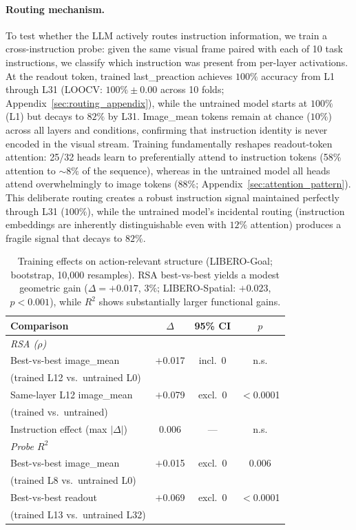 \paragraph{Routing mechanism.}
To test whether the LLM actively routes instruction information, we train a cross-instruction probe: given the same visual frame paired with each of 10 task instructions, we classify which instruction was present from per-layer activations.
At the readout token, trained last\_preaction achieves $100\%$ accuracy from L1 through L31 (LOOCV: $100\% \pm 0.00$ across 10 folds; Appendix~\ref{sec:routing_appendix}), while the untrained model starts at $100\%$ (L1) but decays to $82\%$ by L31.
Image\_mean tokens remain at chance ($10\%$) across all layers and conditions, confirming that instruction identity is never encoded in the visual stream.
Training fundamentally reshapes readout-token attention: 25/32 heads learn to preferentially attend to instruction tokens (58\% attention to ${\sim}8\%$ of the sequence), whereas in the untrained model all heads attend overwhelmingly to image tokens (88\%; Appendix~\ref{sec:attention_pattern}).
This deliberate routing creates a robust instruction signal maintained perfectly through L31 ($100\%$), while the untrained model's incidental routing (instruction embeddings are inherently distinguishable even with $12\%$ attention) produces a fragile signal that decays to $82\%$.

\begin{table}[t]
\centering
\caption{Training effects on action-relevant structure (LIBERO-Goal; bootstrap, 10{,}000 resamples). RSA best-vs-best yields a modest geometric gain ($\Delta{=}+0.017$, $3\%$; LIBERO-Spatial: $+0.023$, $p{<}0.001$), while $R^2$ shows substantially larger functional gains.}
\label{tab:training_effects}
\small
\begin{tabular}{lccc}
\toprule
Comparison & $\Delta$ & 95\% CI & $p$ \\
\midrule
\multicolumn{4}{l}{\emph{RSA ($\rho$)}} \\
Best-vs-best image\_mean & $+$0.017 & incl.\ 0 & n.s. \\
\quad (trained L12 vs.\ untrained L0) & & & \\
Same-layer L12 image\_mean & $+$0.079 & excl.\ 0 & $<$0.0001 \\
\quad (trained vs.\ untrained) & & & \\
Instruction effect (max $|\Delta|$) & 0.006 & --- & n.s. \\
\midrule
\multicolumn{4}{l}{\emph{Probe $R^2$}} \\
Best-vs-best image\_mean & $+$0.015 & excl.\ 0 & 0.006 \\
\quad (trained L8 vs.\ untrained L0) & & & \\
Best-vs-best readout & $+$0.069 & excl.\ 0 & $<$0.0001 \\
\quad (trained L13 vs.\ untrained L32) & & & \\
\bottomrule
\end{tabular}
\end{table}


